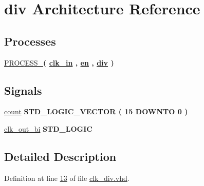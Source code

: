 \hypertarget{classclk__div_1_1div}{}\section{div Architecture Reference}
\label{classclk__div_1_1div}
\subsection*{Processes}
 \begin{DoxyCompactItemize}
\item 
\hyperlink{classclk__div_1_1div_a0a2b446597a947bf6a5807498fa17ba1}{P\+R\+O\+C\+E\+S\+S\+\_}{\bfseries  ( {\bfseries {\bfseries \hyperlink{classclk__div_a57fad7f33f7766724bdea76e7b0330ef}{clk\+\_\+in}} \textcolor{vhdlchar}{ }} , {\bfseries {\bfseries \hyperlink{classclk__div_a512588aa484615b7e90600a1bc9507b4}{en}} \textcolor{vhdlchar}{ }} , {\bfseries {\bfseries \hyperlink{classclk__div_a425c2042b3ea21827b9b29c6712312d9}{div}} \textcolor{vhdlchar}{ }} )}
\end{DoxyCompactItemize}
\subsection*{Signals}
 \begin{DoxyCompactItemize}
\item 
\hyperlink{classclk__div_1_1div_a25d9525383f1b60f7c2e081319516a96}{count} {\bfseries \textcolor{comment}{S\+T\+D\+\_\+\+L\+O\+G\+I\+C\+\_\+\+V\+E\+C\+T\+O\+R}\textcolor{vhdlchar}{ }\textcolor{vhdlchar}{(}\textcolor{vhdlchar}{ }\textcolor{vhdlchar}{ } \textcolor{vhdldigit}{15} \textcolor{vhdlchar}{ }\textcolor{keywordflow}{D\+O\+W\+N\+T\+O}\textcolor{vhdlchar}{ }\textcolor{vhdlchar}{ } \textcolor{vhdldigit}{0} \textcolor{vhdlchar}{ }\textcolor{vhdlchar}{)}\textcolor{vhdlchar}{ }} 
\item 
\hyperlink{classclk__div_1_1div_a91ef6072d99aa4429fb1b3a883554754}{clk\+\_\+out\+\_\+bi} {\bfseries \textcolor{comment}{S\+T\+D\+\_\+\+L\+O\+G\+I\+C}\textcolor{vhdlchar}{ }} 
\end{DoxyCompactItemize}


\subsection{Detailed Description}


Definition at line \hyperlink{clk__div_8vhd_source_l00013}{13} of file \hyperlink{clk__div_8vhd_source}{clk\+\_\+div.\+vhd}.



